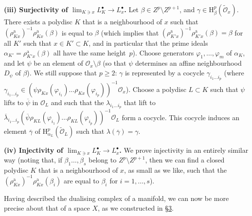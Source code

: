 \documentclass[british]{article}
\newenvironment{rmenv}[1]
  {\phantomsection\par\smallskip\noindent\textbf{#1.}\rmfamily}
  {\par\smallskip}
\newcommand{\oldpage}[1]{\marginpar{\footnotesize$\Big\vert$ \textit{p.~#1}}}
\begin{document}
\protect{}\label{section-5.b.iii}
\begin{rmenv}{(iii) Surjectivity of $\lim_{K\ni x}L_K^\bullet\to L_x^\bullet$}
Let \(\beta\in Z^p\setminus Z^{p+1}\), and
\(\gamma\in\mathrm{H}_\beta^p(\widetilde{{\mathscr{O}}}_x)\). There
exists a polydisc \(K\) that is a neighbourhood of \(x\) such that
\((\rho_{Kx}^\mathrm{a})^{-1}\rho_{Kx}^\mathrm{a}(\beta)\) is equal to
\(\beta\) (which implies that
\((\rho_{K'x}^\mathrm{a})^{-1}\rho_{K'x}^\mathrm{a}(\beta)=\beta\) for
all \(K'\) such that \(x\in K'\subset K\), and in particular that the
prime ideals \(\alpha_{K'}=\rho_{K'x}^\mathrm{a}(\beta)\) all have the
same height~\(p\)). Choose generators \(\varphi_1,\ldots,\varphi_m\) of
\(\alpha_K\), and let \(\psi\) be an element of
\({\mathscr{O}}_x\setminus\beta\) (so that \(\psi\) determines an affine
neighbourhood \(D_\psi\) of \(\beta\)). We still suppose that
\(p\geqslant2\): \(\gamma\) is represented by a cocycle
\(\gamma_{i_1\ldots i_p}\) (where
\(\gamma_{i_1\ldots i_p}\in(\psi\rho_{Kx}(\varphi_{i_1})\ldots\rho_{Kx}(\varphi_{i_p}))^{-1}{\mathscr{O}}_x\)).
Choose a polydisc \(L\subset K\) such that \(\psi\) lifts to
\(\overline{\psi}\) in \({\mathscr{O}}_L\) and such that the
\(\lambda_{i_1\ldots i_p}\) that lift to
\(\overline{\lambda}_{i_1\ldots i_p}(\overline{\psi}\rho_{KL}(\varphi_{i_1})\ldots\rho_{KL}(\varphi_{i_p}))^{-1}{\mathscr{O}}_L\)
form a cocycle. This cocycle induces an element \(\overline{\gamma}\) of
\(\mathrm{H}_{\alpha_L}^p(\widetilde{{\mathscr{O}}}_L)\) such that
\(\lambda(\overline{\gamma})=\gamma\).

\end{rmenv}

\protect{}\label{section-5.b.iv}
\begin{rmenv}{(iv) Injectivity of $\lim_{K\ni x}L_K^\bullet\to L_x^\bullet$}
We prove injectivity in an entirely similar way (noting that, if
\(\beta_1\ldots,\beta_s\) belong to \(Z^p\setminus Z^{p+1}\), then we
can find a closed polydisc \(K\) that is a neighbourhood of \(x\), as
small as we like, such that the
\((\rho_{Kx}^\mathrm{a})^{-1}\rho_{Kx}^\mathrm{a}(\beta_i)\) are equal
to \(\beta_i\) for \(i=1,\ldots,s\)). \oldpage{89}

\end{rmenv}

Having described the dualising complex of a manifold, we can now be more
precise about that of a space \(X\), as we constructed in
\hyperref[section-3]{§3}.
\end{document}
